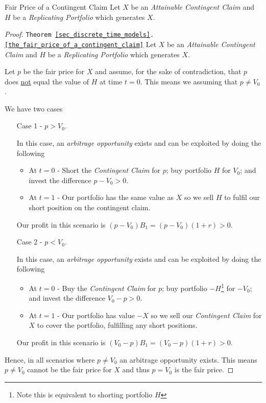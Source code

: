 \documentclass[11pt,a4paper]{article}
\begin{document}
  \begin{theorem}{Fair Price of a Contingent Claim}\label{the_fair_price_of_a_contingent_claim}
    Let $X$ be an \textit{Attainable Contingent Claim} and $H$ be a \textit{Replicating Portfolio} which generates $X$.
    \begin{quote}
    \end{quote}
  \end{theorem}

  \begin{proof}{\texttt{Theorem \ref{sec_discrete_time_models}.\ref{the_fair_price_of_a_contingent_claim}}}
    Let $X$ be an \textit{Attainable Contingent Claim} and $H$ be a \textit{Replicating Portfolio} which generates $X$.
    \par Let $p$ be the fair price for $X$ and assume, for the sake of contradiction, that $p$ does \underline{not} equal the value of $H$ at time $t=0$. This means we assuming that $p\neq V_0$.
    \par We have two cases
    \begin{itemize}
      \item[Case 1] - $p>V_0$.
      \par In this case, an \textit{arbitrage opportunity} exists and can be exploited by doing the following
      \begin{itemize}
        \item At $t=0$ - Short the \textit{Contingent Claim} for $p$; buy portfolio $H$ for $V_0$; and invest the difference $p-V_0>0$.
        \item At $t=1$ - Our portfolio has the same value as $X$ so we sell $H$ to fulfil our short position on the contingent claim.
      \end{itemize}
      Our profit in this scenario is $(p-V_0)B_1=(p-V_0)(1+r)>0$.
      \item[Case 2] - $p<V_0$.
      \par In this case, an \textit{arbitrage opportunity} exists and can be exploited by doing the following
      \begin{itemize}
        \item At $t=0$ - Buy the \textit{Contingent Claim} for $p$; buy portfolio $-H$\footnote{Note this is equivalent to shorting portfolio $H$} for $-V_0$; and invest the difference $V_0-p>0$.
        \item At $t=1$ - Our portfolio has value $-X$ so we sell our \textit{Contingent Claim} for $X$ to cover the portfolio, fulfilling any short positions.
      \end{itemize}
      Our profit in this scenario is $(V_0-p)B_1=(V_0-p)(1+r)>0$.
    \end{itemize}
    Hence, in all scenarios where $p\neq V_0$ an arbitrage opportunity exists.
    This means $p\neq V_0$ cannot be the fair price for $X$ and thus $p=V_0$ is the fair price.\proved
  \end{proof}
\end{document}
